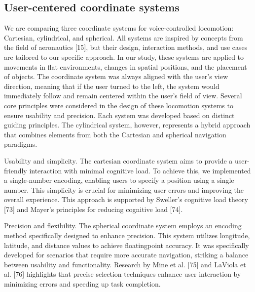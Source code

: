 \documentclass[preprint,12pt]{elsarticle}
\newcommand{\reftext}[1]{{\color{gray}#1}}   %
\begin{document}
\subsection{User-centered coordinate systems}
\reftext{We are comparing three coordinate systems for voice-controlled locomotion: Cartesian, cylindrical, and spherical. All systems are inspired by concepts from the field of aeronautics [15], but their design, interaction methods, and use cases are tailored to our specific approach. In our study, these systems are applied to movements in flat environments, changes in spatial positions, and the placement of objects. The coordinate system was always aligned with the user's view direction, meaning that if the user turned to the left, the system would immediately follow and remain centered within the user's field of view. Several core principles were considered in the design of these locomotion systems to ensure usability and precision. Each system was developed based on distinct guiding principles. The cylindrical system, however, represents a hybrid approach that combines elements from both the Cartesian and spherical navigation paradigms.}

\reftext{Usability and simplicity. The cartesian coordinate system aims to provide a user-friendly interaction with minimal cognitive load. To achieve this, we implemented a single-number encoding, enabling users to specify a position using a single number. This simplicity is crucial for minimizing user errors and improving the overall experience. This approach is supported by Sweller's cognitive load theory [73] and Mayer's principles for reducing cognitive load [74].}

\reftext{Precision and flexibility. The spherical coordinate system employs an encoding method specifically designed to enhance precision. This system utilizes longitude, latitude, and distance values to achieve floatingpoint accuracy. It was specifically developed for scenarios that require more accurate navigation, striking a balance between usability and functionality. Research by Mine et al. [75] and LaViola et al. [76] highlights that precise selection techniques enhance user interaction by minimizing errors and speeding up task completion.}
\end{document}

